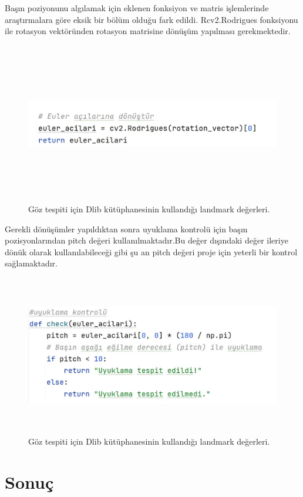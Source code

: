 \documentclass[12pt, a4paper]{article}
\begin{document}
		 Başın poziyonunu algılamak için eklenen fonksiyon ve matris işlemlerinde araştırmalara göre eksik bir bölüm olduğu fark edildi. Rcv2.Rodrigues fonksiyonu ile rotasyon vektöründen rotasyon matrisine dönüşüm yapılması gerekmektedir.\newpage
		\begin{figure}[!h]
			\centering
			\includegraphics[width=17cm, height=7cm, keepaspectratio]{redkullan.jpg}
			\caption{Göz tespiti için Dlib kütüphanesinin kullandığı landmark değerleri.} 
		\end{figure}
		Gerekli dönüşümler yapıldıktan sonra uyuklama kontrolü için başın pozisyonlarından pitch değeri kullanılmaktadır.Bu değer dışındaki değer ileriye dönük olarak kullanılabileceği gibi şu an pitch değeri proje için yeterli bir kontrol sağlamaktadır.\par 
		 \begin{figure}[!h]
			\centering
			\includegraphics[width=17cm, height=7cm, keepaspectratio]{uyuklamakont.jpg}
			\caption{Göz tespiti için Dlib kütüphanesinin kullandığı landmark değerleri.} 
		\end{figure}
		 
		 
	\section{Sonuç}
\end{document}
